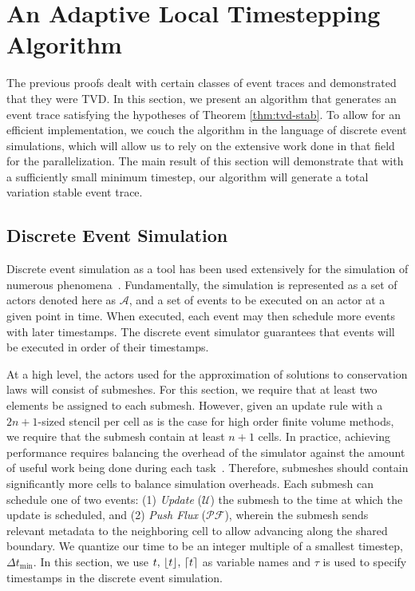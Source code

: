 \section{An Adaptive Local Timestepping Algorithm}
\label{sec:alg}
The previous proofs dealt with certain classes of event traces and demonstrated that they were TVD. In this section, we present an algorithm that generates an event trace satisfying the hypotheses of Theorem \ref{thm:tvd-stab}. To allow for an efficient implementation, we couch the algorithm in the language of discrete event simulations, which will allow us to rely on the extensive work done in that field for the parallelization. The main result of this section will demonstrate that with a sufficiently small minimum timestep, our algorithm will generate a total variation stable event trace.

\subsection{Discrete Event Simulation}
Discrete event simulation as a tool has been used extensively for the simulation of numerous phenomena~\cite{Fujimoto1990}. Fundamentally, the simulation is represented as a set of actors denoted here as $\mathcal{A}$, and a set of events to be executed on an actor at a given point in time. When executed, each event may then schedule more events with later timestamps. The discrete event simulator guarantees that events will be executed in order of their timestamps.

At a high level, the actors used for the approximation of solutions to conservation laws will consist of submeshes. For this section, we require that at least two elements be assigned to each submesh. However, given an update rule with a $2n+1$-sized stencil per cell as is the case for high order finite volume methods, we require that the submesh contain at least $n+1$ cells. In practice, achieving performance requires balancing the overhead of the simulator against the amount of useful work being done during each task~\cite{Bremer2019}. Therefore, submeshes should contain significantly more cells to balance simulation overheads. Each submesh can schedule one of two events: (1) {\em Update} ($\mathcal{U}$) the submesh to the time at which the update is scheduled, and (2) {\em Push Flux} ($\mathcal{PF}$), wherein the submesh sends relevant metadata to the neighboring cell to allow advancing along the shared boundary. We quantize our time to be an integer multiple of a smallest timestep, $\Delta t_{\min}$. In this section, we use $t,\,\lfloor t \rfloor,\,\lceil t \rceil$ as variable names and $\tau$ is used to specify timestamps in the discrete event simulation.

